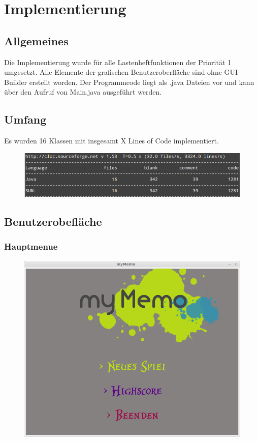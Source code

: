 \clearpage

\chapter{Implementierung}

\section{Allgemeines}
Die Implementierung wurde für alle Lastenheftfunktionen der Priorität 1 umgesetzt. Alle Elemente der grafischen Benutzeroberfläche sind ohne GUI-Builder erstellt worden. Der Programmcode liegt als .java Dateien vor und kann über den Aufruf von Main.java ausgeführt werden.

\section{Umfang}
Es wurden 16 Klassen mit insgesamt X Lines of Code implementiert.

\begin{figure}[!h]
	\centering
    \includegraphics[width=\textwidth]{./cloc.png}
	\label{layout_gesamt}
\end{figure}


\clearpage
\section{Benutzerobefläche}

\subsection{Hauptmenue}
\begin{figure}[!h]
	\centering
    \includegraphics[width=\textwidth]{./guiHauptmenue.png}
	\label{}
\end{figure}
